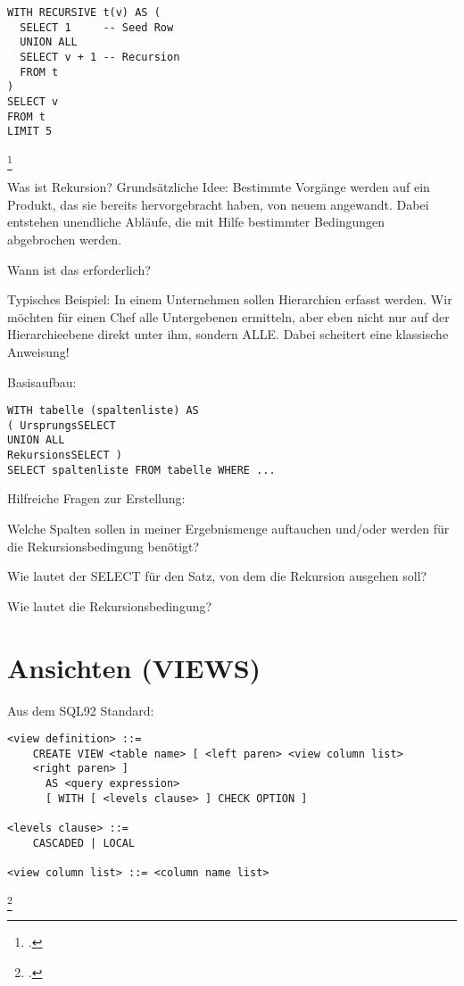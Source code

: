 \documentclass{lehramt-informatik-haupt}
\begin{document}
\begin{quellen}
\item \cite[Seite 136]{kemper}
\item \cite[Seite 27-31]{db:fs:3}
\item \cite{db:html:jaxenter:rekursives-sql}
\end{quellen}

\begin{verbatim}
WITH RECURSIVE t(v) AS (
  SELECT 1     -- Seed Row
  UNION ALL
  SELECT v + 1 -- Recursion
  FROM t
)
SELECT v
FROM t
LIMIT 5
\end{verbatim}
\footcite{db:html:jaxenter:rekursives-sql}

Was ist Rekursion? Grundsätzliche Idee: Bestimmte Vorgänge werden auf
ein Produkt, das sie bereits hervorgebracht haben, von neuem angewandt.
Dabei entstehen unendliche Abläufe, die mit Hilfe bestimmter Bedingungen
abgebrochen werden.

Wann ist das erforderlich?

Typisches Beispiel: In einem Unternehmen sollen Hierarchien erfasst
werden. Wir möchten für einen Chef alle Untergebenen ermitteln, aber
eben nicht nur auf der Hierarchieebene direkt unter ihm, sondern ALLE.
Dabei scheitert eine klassische Anweisung!

Basisaufbau:

\begin{verbatim}
WITH tabelle (spaltenliste) AS
( UrsprungsSELECT
UNION ALL
RekursionsSELECT )
SELECT spaltenliste FROM tabelle WHERE ...
\end{verbatim}

Hilfreiche Fragen zur Erstellung:

Welche Spalten sollen in meiner Ergebnismenge auftauchen und/oder werden
für die Rekursionsbedingung benötigt?

Wie lautet der SELECT für den Satz, von dem die Rekursion ausgehen soll?

Wie lautet die Rekursionsbedingung?

%

\section{Ansichten (VIEWS)}

Aus dem SQL92 Standard:

\begin{verbatim}
<view definition> ::=
    CREATE VIEW <table name> [ <left paren> <view column list>
    <right paren> ]
      AS <query expression>
      [ WITH [ <levels clause> ] CHECK OPTION ]

<levels clause> ::=
    CASCADED | LOCAL

<view column list> ::= <column name list>
\end{verbatim}
\footcite[Seite 296]{sql92}
\end{document}

